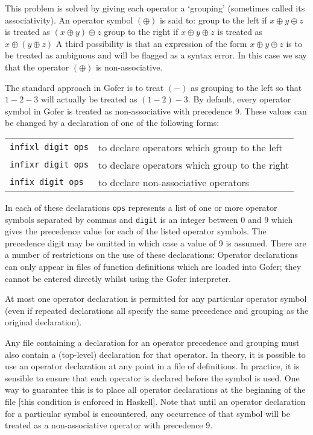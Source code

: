      This problem is  solved  by  giving  each  operator  a  `grouping'
     (sometimes called its associativity).  An operator symbol  $(\oplus)$  is
     said to:
     \BI
     \IT  group to the left  if $x \oplus y \oplus z$ 
          is treated as $(x \oplus y) \oplus z$
     \IT  group to the right if $x \oplus y \oplus z$ 
          is treated as $x \oplus (y \oplus z)$
     \EI
     A third possibility is that an expression of the form 
     $x \oplus y \oplus  z$
     is to be treated as ambiguous and will  be  flagged  as  a  syntax
     error.   In  this  case  we  say  that   the   operator   $(\oplus)$   is
     non-associative.

     The standard approach in Gofer is to treat $(-)$ as grouping to  the
     left so that $1 - 2 - 3$ will actually be treated as $(1-2)-3$.
\EI
By  default,  every  operator   symbol   in   Gofer   is   treated   as
non-associative with precedence 9.  These values can be  changed  by  a
declaration of one of the following forms:
\BQ
\begin{tabular}{ll}
    {\tt infixl digit ops} &     to declare operators which group to the left\\
    {\tt infixr digit ops} &     to declare operators which group to the right\\
    {\tt infix  digit ops} &     to declare non-associative operators
\end{tabular}
\EQ
In each of these declarations \verb"ops" represents a  list  of  one  or  more
operator symbols separated by commas and \verb"digit" is an integer between  0
and 9 which gives the precedence value for each of the listed  operator
symbols.  The precedence digit may be omitted in which case a value  of
9 is assumed.  There are a number of restrictions on the use  of  these
declarations:
\BI
\IT  Operator  declarations  can  only  appear  in  files  of  function
     definitions which are loaded into Gofer; they  cannot  be  entered
     directly whilst using the Gofer interpreter.

\IT  At most one operator declaration is permitted for  any  particular
     operator symbol (even if repeated  declarations  all  specify  the
     same precedence and grouping as the original declaration).

\IT  Any file containing a declaration for an operator  precedence  and
     grouping must also contain  a  (top-level)  declaration  for  that
     operator.
\EI
In theory, it is possible to use an operator declaration at  any  point
in a file of definitions.  In practice, it is sensible to  ensure  that
each operator is declared before  the  symbol  is  used.   One  way  to
guarantee this is to place all operator declarations at  the  beginning
of the file [this condition is enforced in Haskell].  Note  that  until
an operator declaration for a particular  symbol  is  encountered,  any
occurrence of that symbol will be treated as a non-associative operator
with precedence 9.

